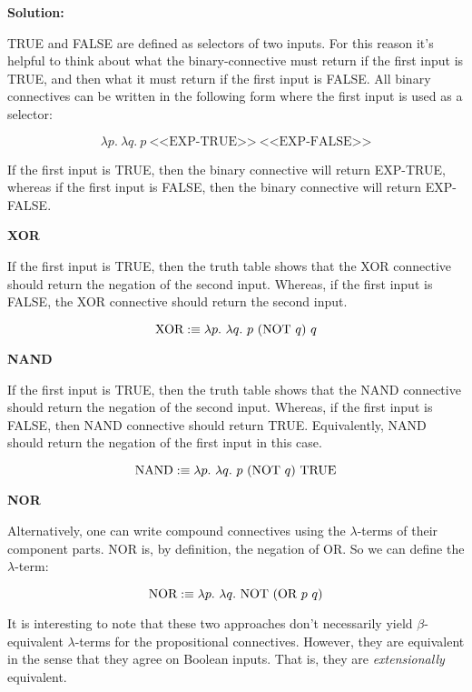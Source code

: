 \documentclass[11pt]{report}
\begin{document}
\begin{enumerate}
	{\bf Solution:}

	TRUE and FALSE are defined as selectors of two inputs. For this reason it's helpful to think about what the binary-connective must return if the first input is TRUE, and then what it must return if the first input is FALSE. All binary connectives can be written in the following form where the first input is used as a selector: 

	$$\lambda p. \ \lambda q. \ p \ \text{<<EXP-TRUE>>} \ \text{<<EXP-FALSE>>}$$

	If the first input is TRUE, then the binary connective will return EXP-TRUE, whereas if the first input is FALSE, then the binary connective will return EXP-FALSE. 

	\hspace{0.5cm} {\bf XOR}

	If the first input is TRUE, then the truth table shows that the XOR connective should return the negation of the second input. Whereas, if the first input is FALSE, the XOR connective should return the second input. 

	$$\text{XOR} :\equiv \lambda p. \ \lambda q. \ p \ (\text{NOT} \ q) \ q$$

	\hspace{0.5cm} {\bf NAND}

	If the first input is TRUE, then the truth table shows that the NAND connective should return the negation of the second input. Whereas, if the first input is FALSE, then NAND connective should return TRUE. Equivalently, NAND should return the negation of the first input in this case. 

	$$\NAND :\equiv \lambda p. \ \lambda q. \ p \ (\NOT \ q) \ \TRUE$$

	\hspace{0.5cm} {\bf NOR}

	Alternatively, one can write compound connectives using the $\lambda$-terms of their component parts. NOR is, by definition, the negation of OR. So we can define the $\lambda$-term: 

	$$\NOR :\equiv \lambda p. \ \lambda q. \ \NOT \ (\OR \ p \ q)$$

	\vspace{0.5cm}

	It is interesting to note that these two approaches don't necessarily yield $\beta$-equivalent $\lambda$-terms for the propositional connectives. However, they are equivalent in the sense that they agree on Boolean inputs. That is, they are \emph{extensionally} equivalent. 


\end{enumerate}
\end{document}
